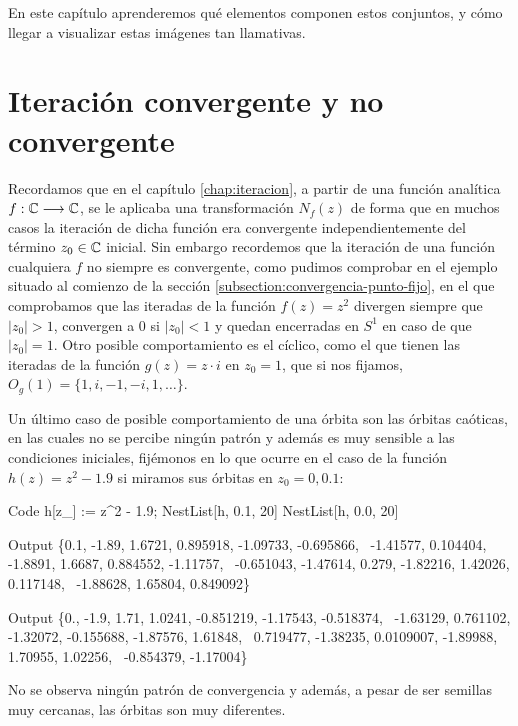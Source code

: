 En este capítulo aprenderemos qué elementos componen estos conjuntos, y cómo llegar a visualizar estas imágenes tan llamativas.

\section{Iteración convergente y no convergente}

Recordamos que en el capítulo \ref{chap:iteracion}, a partir de una función analítica $f:\mathbb{C}\longrightarrow\mathbb{C}$, se le aplicaba una transformación $N_f(z)$ de forma que en muchos casos la iteración de dicha función era convergente independientemente del término $z_0\in\mathbb{C}$ inicial. Sin embargo recordemos que la iteración de una función cualquiera $f$ no siempre es convergente, como pudimos comprobar en el ejemplo situado al comienzo de la sección \ref{subsection:convergencia-punto-fijo}, en el que comprobamos que las iteradas de la función $f(z)=z^2$ divergen siempre que $|z_0|>1$, convergen a $0$ si $|z_0|<1$ y quedan encerradas en $S^1$ en caso de que $|z_0|=1$. Otro posible comportamiento es el cíclico, como el que tienen las iteradas de la función $g(z)=z\cdot i$ en $z_0=1$, que si nos fijamos, $O_g(1)=\{1,i,-1,-i,1,\dots\}$. 

Un último caso de posible comportamiento de una órbita son las órbitas caóticas, en las cuales no se percibe ningún patrón y además es muy sensible a las condiciones iniciales, fijémonos en lo que ocurre en el caso de la función $h(z)=z^2-1.9$ si miramos sus órbitas en $z_0=0,0.1$:

\begin{mmaCell}{Code}
  h[z_] := z^2 - 1.9;
  NestList[h, 0.1, 20]
  NestList[h, 0.0, 20]
\end{mmaCell}
\begin{mmaCell}{Output}
  \{0.1, -1.89, 1.6721, 0.895918, -1.09733, -0.695866,  \
  -1.41577, 0.104404, -1.8891, 1.6687, 0.884552, -1.11757, \
  -0.651043, -1.47614, 0.279, -1.82216, 1.42026, 0.117148, \
  -1.88628, 1.65804, 0.849092\}
\end{mmaCell}
\begin{mmaCell}{Output}
  \{0., -1.9, 1.71, 1.0241, -0.851219, -1.17543, -0.518374, \
  -1.63129, 0.761102, -1.32072, -0.155688, -1.87576, 1.61848, \
  0.719477, -1.38235, 0.0109007, -1.89988, 1.70955, 1.02256, \
  -0.854379, -1.17004\}
  \end{mmaCell}

No se observa ningún patrón de convergencia y además, a pesar de ser semillas muy cercanas, las órbitas son muy diferentes.

